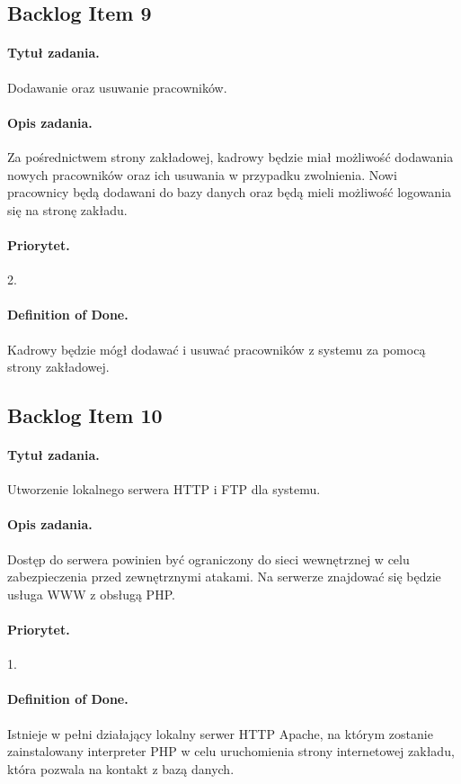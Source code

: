 \documentclass[a4paper]{article}
\begin{document}
\subsection{Backlog Item 9}
\paragraph{Tytuł zadania.} Dodawanie oraz usuwanie pracowników.
\paragraph{Opis zadania.} Za pośrednictwem strony zakładowej, kadrowy będzie miał możliwość dodawania nowych pracowników oraz ich usuwania w przypadku zwolnienia. Nowi pracownicy będą dodawani do bazy danych oraz będą mieli możliwość logowania się na stronę zakładu.
\paragraph{Priorytet.} 2.
\paragraph{Definition of Done.} Kadrowy będzie mógł dodawać i usuwać pracowników z systemu za pomocą strony zakładowej.

\subsection{Backlog Item 10}
\paragraph{Tytuł zadania.} Utworzenie lokalnego serwera HTTP i FTP dla systemu.
\paragraph{Opis zadania.} Dostęp do serwera powinien być ograniczony do sieci wewnętrznej w celu zabezpieczenia przed zewnętrznymi atakami. Na serwerze znajdować się będzie usługa WWW z obsługą PHP.
\paragraph{Priorytet.} 1.
\paragraph{Definition of Done.} Istnieje w pełni działający lokalny serwer HTTP Apache, na którym zostanie zainstalowany interpreter PHP w celu uruchomienia strony internetowej zakładu, która pozwala na kontakt z bazą danych.
\end{document}

